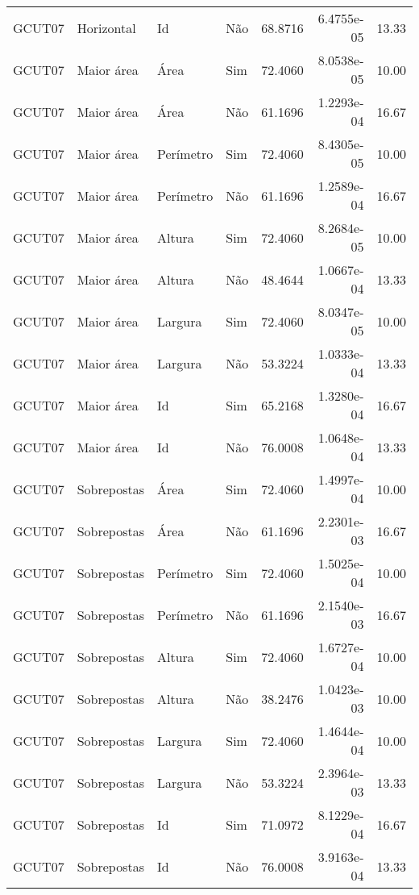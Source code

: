 \begin{tabular}{llllrrr}
GCUT07    & Horizontal  & Id        & Não         & 68.8716      & 6.4755e-05 & 13.33    \\
GCUT07    & Maior área  & Área      & Sim         & 72.4060      & 8.0538e-05 & 10.00    \\
GCUT07    & Maior área  & Área      & Não         & 61.1696      & 1.2293e-04 & 16.67    \\
GCUT07    & Maior área  & Perímetro & Sim         & 72.4060      & 8.4305e-05 & 10.00    \\
GCUT07    & Maior área  & Perímetro & Não         & 61.1696      & 1.2589e-04 & 16.67    \\
GCUT07    & Maior área  & Altura    & Sim         & 72.4060      & 8.2684e-05 & 10.00    \\
GCUT07    & Maior área  & Altura    & Não         & 48.4644      & 1.0667e-04 & 13.33    \\
GCUT07    & Maior área  & Largura   & Sim         & 72.4060      & 8.0347e-05 & 10.00    \\
GCUT07    & Maior área  & Largura   & Não         & 53.3224      & 1.0333e-04 & 13.33    \\
GCUT07    & Maior área  & Id        & Sim         & 65.2168      & 1.3280e-04 & 16.67    \\
GCUT07    & Maior área  & Id        & Não         & 76.0008      & 1.0648e-04 & 13.33    \\
GCUT07    & Sobrepostas & Área      & Sim         & 72.4060      & 1.4997e-04 & 10.00    \\
GCUT07    & Sobrepostas & Área      & Não         & 61.1696      & 2.2301e-03 & 16.67    \\
GCUT07    & Sobrepostas & Perímetro & Sim         & 72.4060      & 1.5025e-04 & 10.00    \\
GCUT07    & Sobrepostas & Perímetro & Não         & 61.1696      & 2.1540e-03 & 16.67    \\
GCUT07    & Sobrepostas & Altura    & Sim         & 72.4060      & 1.6727e-04 & 10.00    \\
GCUT07    & Sobrepostas & Altura    & Não         & 38.2476      & 1.0423e-03 & 10.00    \\
GCUT07    & Sobrepostas & Largura   & Sim         & 72.4060      & 1.4644e-04 & 10.00    \\
GCUT07    & Sobrepostas & Largura   & Não         & 53.3224      & 2.3964e-03 & 13.33    \\
GCUT07    & Sobrepostas & Id        & Sim         & 71.0972      & 8.1229e-04 & 16.67    \\
GCUT07    & Sobrepostas & Id        & Não         & 76.0008      & 3.9163e-04 & 13.33    \\
\hline
\end{tabular}